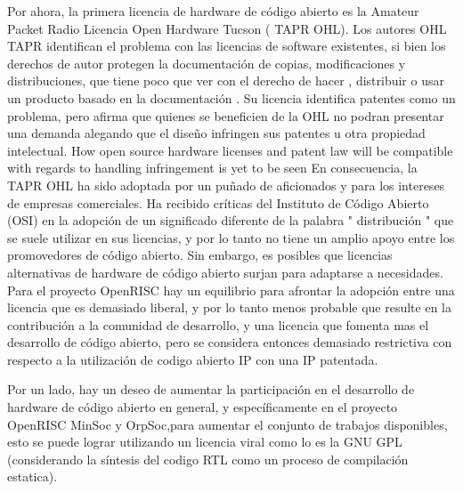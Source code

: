 Por ahora, la primera licencia de hardware de código abierto es la  Amateur Packet Radio Licencia Open Hardware Tucson ( TAPR OHL). Los autores OHL TAPR identifican el problema con las licencias de software existentes, si bien los derechos de autor protegen la documentación de copias, modificaciones y distribuciones, que tiene poco que ver con el derecho de hacer , distribuir o usar un producto basado en la documentación \cite{Etiqueta12}.
Su licencia identifica patentes como un problema, pero afirma que quienes se beneficien de la OHL no podran
presentar una demanda alegando que el diseño infringen sus patentes u otra propiedad intelectual.
How open source hardware licenses and patent law will be compatible with regards to handling infringement is yet to be seen
En consecuencia, la TAPR OHL ha sido adoptada por un puñado de aficionados y para los intereses de empresas comerciales. Ha recibido críticas
del Instituto de Código Abierto (OSI) en la adopción de un significado diferente de la  palabra " distribución " que se suele utilizar en sus licencias, y por lo tanto no tiene un amplio apoyo entre los promovedores de código abierto\cite{Etiqueta13}. 
Sin embargo, es posibles que licencias alternativas de hardware de código abierto surjan para adaptarse a necesidades.
Para el proyecto OpenRISC hay un equilibrio para afrontar la adopción entre una licencia que es demasiado liberal, y por lo tanto menos probable que resulte en la contribución a la comunidad de desarrollo, y una licencia que fomenta mas el desarrollo de código abierto, pero se considera entonces demasiado restrictiva con respecto a la utilización de codigo abierto IP con una IP patentada.

Por un lado, hay un deseo de aumentar la participación en el desarrollo de hardware de código abierto en general, y específicamente en el proyecto OpenRISC MinSoc y OrpSoc,para aumentar el conjunto de trabajos disponibles, esto se puede lograr utilizando un licencia viral como lo es la GNU GPL (considerando la síntesis del codigo RTL como un proceso de compilación estatica). 



